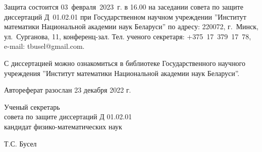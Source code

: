 \documentclass[_00_autoref.tex]{subfiles}
\begin{document}


\medskip
\noindent
Защита состоится 03~февраля~2023~г. в 16.00 на заседании совета по защите диссертаций Д~01.02.01 при Государственном научном учреждении ''Институт математики Национальной академии наук Беларуси'' по адресу: 220072, г.~Минск, ул.~Сурганова, 11, конференц-зал. Тел. ученого секретаря: +375~17~379~17~78, e-mail: tbusel@gmail.com. 

\medskip
\noindent
С диссертацией можно ознакомиться в библиотеке Государственного научного учреждения ''Институт математики Национальной академии наук Беларуси''.

\medskip
\noindent
Автореферат разослан 23 декабря 2022 г.\\

\vfill
\noindent
\begin{minipage}[b]{0.6\textwidth}
    \begin{flushleft}
        Ученый секретарь \\
        совета по защите диссертаций Д 01.02.01 \\
        кандидат физико-математических наук
    \end{flushleft}
\end{minipage}
\begin{minipage}[b]{0.39\textwidth}
    \begin{flushright}
        Т.С. Бусел 
    \end{flushright}
\end{minipage}
\eject

\pagestyle{plain}
\setcounter{page}{1}
\setlength{\voffset}{-8mm}
\end{document}
